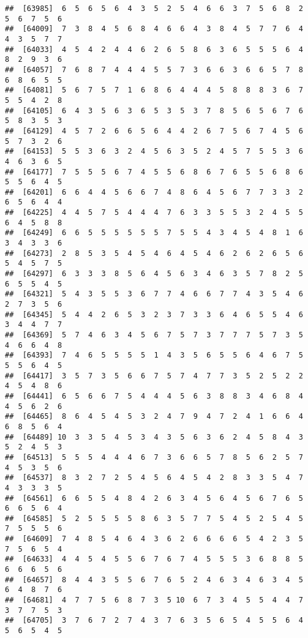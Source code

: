 \documentclass[
]{book}
\begin{document}
\begin{verbatim}
##  [63985]  6  5  6  5  6  4  3  5  2  5  4  6  6  3  7  5  6  8  2  5  6  7  5  6
##  [64009]  7  3  8  4  5  6  8  4  6  6  4  3  8  4  5  7  7  6  4  4  3  5  7  7
##  [64033]  4  5  4  2  4  4  6  2  6  5  8  6  3  6  5  5  5  6  4  8  2  9  3  6
##  [64057]  7  6  8  7  4  4  4  5  5  7  3  6  6  3  6  6  5  7  8  6  8  6  5  5
##  [64081]  5  6  7  5  7  1  6  8  6  4  4  4  5  8  8  8  3  6  7  5  5  4  2  8
##  [64105]  6  4  3  5  6  3  6  5  3  5  3  7  8  5  6  5  6  7  6  5  8  3  5  3
##  [64129]  4  5  7  2  6  6  5  6  4  4  2  6  7  5  6  7  4  5  6  5  7  3  2  6
##  [64153]  5  5  3  6  3  2  4  5  6  3  5  2  4  5  7  5  5  3  6  4  6  3  6  5
##  [64177]  7  5  5  5  6  7  4  5  5  6  8  6  7  6  5  5  6  8  6  5  5  6  4  5
##  [64201]  6  6  4  4  5  6  6  7  4  8  6  4  5  6  7  7  3  3  2  6  5  6  4  4
##  [64225]  4  4  5  7  5  4  4  4  7  6  3  3  5  5  3  2  4  5  5  6  4  5  8  8
##  [64249]  6  6  5  5  5  5  5  5  7  5  5  4  3  4  5  4  8  1  6  3  4  3  3  6
##  [64273]  2  8  5  3  5  4  5  4  6  4  5  4  6  2  6  2  6  5  6  5  4  5  7  5
##  [64297]  6  3  3  3  8  5  6  4  5  6  3  4  6  3  5  7  8  2  5  6  5  5  4  5
##  [64321]  5  4  3  5  5  3  6  7  7  4  6  6  7  7  4  3  5  4  6  2  7  3  5  6
##  [64345]  5  4  4  2  6  5  3  2  3  7  3  3  6  4  6  5  5  4  6  3  4  4  7  7
##  [64369]  5  7  4  6  3  4  5  6  7  5  7  3  7  7  7  5  7  3  5  4  6  6  4  8
##  [64393]  7  4  6  5  5  5  5  1  4  3  5  6  5  5  6  4  6  7  5  5  5  6  4  5
##  [64417]  3  5  7  3  5  6  6  7  5  7  4  7  7  3  5  2  5  2  2  4  5  4  8  6
##  [64441]  6  5  6  6  7  5  4  4  4  5  6  3  8  8  3  4  6  8  4  4  5  6  2  6
##  [64465]  8  6  4  5  4  5  3  2  4  7  9  4  7  2  4  1  6  6  4  6  8  5  6  4
##  [64489] 10  3  3  5  4  5  3  4  3  5  6  3  6  2  4  5  8  4  3  5  2  4  5  3
##  [64513]  5  5  5  4  4  4  6  7  3  6  6  5  7  8  5  6  2  5  7  4  5  3  5  6
##  [64537]  8  3  2  7  2  5  4  5  6  4  5  4  2  8  3  3  5  4  7  4  3  3  3  5
##  [64561]  6  6  5  5  4  8  4  2  6  3  4  5  6  4  5  6  7  6  5  6  6  5  6  4
##  [64585]  5  2  5  5  5  5  8  6  3  5  7  7  5  4  5  2  5  4  5  7  5  5  5  6
##  [64609]  7  4  8  5  4  6  4  3  6  2  6  6  6  6  5  4  2  3  5  7  5  6  5  4
##  [64633]  4  4  5  4  5  5  6  7  6  7  4  5  5  5  3  6  8  8  5  6  6  6  5  6
##  [64657]  8  4  4  3  5  5  6  7  6  5  2  4  6  3  4  6  3  4  5  6  4  8  7  6
##  [64681]  4  7  7  5  6  8  7  3  5 10  6  7  3  4  5  5  4  4  7  3  7  7  5  3
##  [64705]  3  7  6  7  2  7  4  3  7  6  3  5  6  5  4  5  5  6  4  5  6  5  4  5

\end{verbatim}
\end{document}
